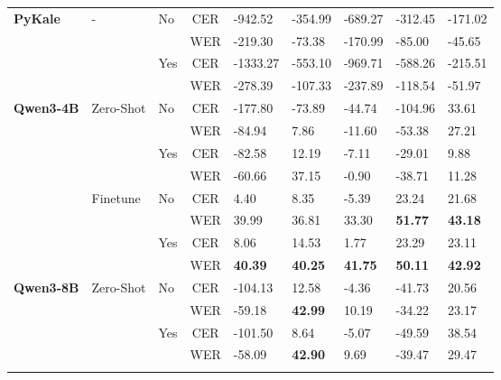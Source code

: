 \documentclass[11pt]{extarticle}
\newcommand{\cR}[1]{\cellcolor{badred}#1}
\newcommand{\cG}[1]{\cellcolor{goodgreen}#1}
\newcommand{\cB}[1]{\cellcolor{bestgreen}\textbf{#1}} %
\begin{document}
\begin{table}[htbp]
{\begin{tabular}{lllc *{5}{>{\centering\arraybackslash}p{1.8cm}}}
    \midrule
    \multirow{4}{*}{\textbf{PyKale}} & \multirow{4}{*}{-} & \multirow{2}{*}{No} & CER & \cR{-942.52} & \cR{-354.99} & \cR{-689.27} & \cR{-312.45} & \cR{-171.02} \\
    & & & WER & \cR{-219.30} & \cR{-73.38} & \cR{-170.99} & \cR{-85.00} & \cR{-45.65} \\
    \cmidrule{3-9}
    & & \multirow{2}{*}{Yes} & CER & \cR{-1333.27} & \cR{-553.10} & \cR{-969.71} & \cR{-588.26} & \cR{-215.51} \\
    & & & WER & \cR{-278.39} & \cR{-107.33} & \cR{-237.89} & \cR{-118.54} & \cR{-51.97} \\
    \midrule
    \multirow{8}{*}{\textbf{Qwen3-4B}} & \multirow{4}{*}{Zero-Shot} & \multirow{2}{*}{No} & CER & \cR{-177.80} & \cR{-73.89} & \cR{-44.74} & \cR{-104.96} & \cG{33.61} \\
    & & & WER & \cR{-84.94} & \cG{7.86} & \cR{-11.60} & \cR{-53.38} & \cG{27.21} \\
    \cmidrule{3-9}
    & & \multirow{2}{*}{Yes} & CER & \cR{-82.58} & \cG{12.19} & \cR{-7.11} & \cR{-29.01} & \cG{9.88} \\
    & & & WER & \cR{-60.66} & \cG{37.15} & \cR{-0.90} & \cR{-38.71} & \cG{11.28} \\
    \cmidrule{2-9}
    & \multirow{4}{*}{Finetune} & \multirow{2}{*}{No} & CER & \cG{4.40} & \cG{8.35} & \cR{-5.39} & \cG{23.24} & \cG{21.68} \\
    & & & WER & \cG{39.99} & \cG{36.81} & \cG{33.30} & \cB{51.77} & \cB{43.18} \\
    \cmidrule{3-9}
    & & \multirow{2}{*}{Yes} & CER & \cG{8.06} & \cG{14.53} & \cG{1.77} & \cG{23.29} & \cG{23.11} \\
    & & & WER & \cB{40.39} & \cB{40.25} & \cB{41.75} & \cB{50.11} & \cB{42.92} \\
    \midrule
    \multirow{8}{*}{\textbf{Qwen3-8B}} & \multirow{4}{*}{Zero-Shot} & \multirow{2}{*}{No} & CER & \cR{-104.13} & \cG{12.58} & \cR{-4.36} & \cR{-41.73} & \cG{20.56} \\
    & & & WER & \cR{-59.18} & \cB{42.99} & \cG{10.19} & \cR{-34.22} & \cG{23.17} \\
    \cmidrule{3-9}
    & & \multirow{2}{*}{Yes} & CER & \cR{-101.50} & \cG{8.64} & \cR{-5.07} & \cR{-49.59} & \cG{38.54} \\
    & & & WER & \cR{-58.09} & \cB{42.90} & \cG{9.69} & \cR{-39.47} & \cG{29.47} \\
    \cmidrule{2-9}

\end{tabular}}
\end{table}
\end{document}
